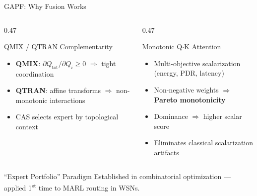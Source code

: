 \documentclass[10pt,aspectratio=169]{beamer}
\begin{document}
\begin{frame}[t]{GAPF: Why Fusion Works}
\begin{columns}[T]
\begin{column}{0.47\textwidth}
  \begin{block}{QMIX / QTRAN Complementarity}
    \begin{itemize}\small\setlength{\itemsep}{1pt}
      \item \textbf{QMIX}: $\partial Q_\text{tot}/\partial Q_i \geq 0$ $\Rightarrow$ tight coordination
      \item \textbf{QTRAN}: affine transforms $\Rightarrow$ non-monotonic interactions
      \item CAS selects expert by topological context
    \end{itemize}
  \end{block}
\end{column}
\begin{column}{0.47\textwidth}
  \begin{block}{Monotonic Q$\cdot$K Attention}
    \begin{itemize}\small\setlength{\itemsep}{1pt}
      \item Multi-objective scalarization (energy, PDR, latency)
      \item Non-negative weights $\Rightarrow$ \textbf{Pareto monotonicity}
      \item Dominance $\Rightarrow$ higher scalar score
      \item Eliminates classical scalarization artifacts
    \end{itemize}
  \end{block}
\end{column}
\end{columns}
\vspace{2pt}
\begin{exampleblock}{``Expert Portfolio'' Paradigm}
  \centering\small
  Established in combinatorial optimization --- applied 1\textsuperscript{st} time to MARL routing in WSNs.
\end{exampleblock}
\end{frame}
\end{document}
